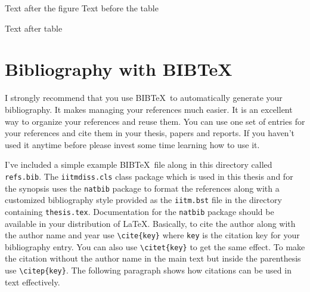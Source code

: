 \documentclass[MS]{iitmdiss}
\begin{document}
Text after the figure
\newpage
Text before the table

\begin{table}[htbp]
\centering
\caption{My caption}\vspace{10mm}
\label{my-label}
\setlength{\fboxrule}{1pt} %
\setlength{\fboxsep}{0.4mm}%
\label{tab:sample}
\end{table}
Text after table

\section{Bibliography with BIB\TeX}

I strongly recommend that you use BIB\TeX\ to automatically generate
your bibliography.  It makes managing your references much easier.  It
is an excellent way to organize your references and reuse them.  You
can use one set of entries for your references and cite them in your
thesis, papers and reports.  If you haven't used it anytime before
please invest some time learning how to use it.  

I've included a simple example BIB\TeX\ file along in this directory
called \verb+refs.bib+.  The \verb+iitmdiss.cls+ class package which
is used in this thesis and for the synopsis uses the \verb+natbib+
package to format the references along with a customized bibliography
style provided as the \verb+iitm.bst+ file in the directory containing
\verb+thesis.tex+.  Documentation for the \verb+natbib+ package should
be available in your distribution of \LaTeX.  Basically, to cite the
author along with the author name and year use \verb+\cite{key}+ where
\verb+key+ is the citation key for your bibliography entry.  You can
also use \verb+\citet{key}+ to get the same effect.  To make the
citation without the author name in the main text but inside the
parenthesis use \verb+\citep{key}+.  The following paragraph shows how
citations can be used in text effectively.
\end{document}
